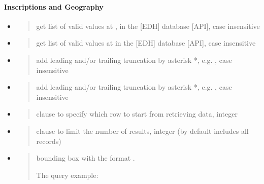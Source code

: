 \documentclass[a4paper,12pt,english]{sphinxhowto}
\begin{document}
\paragraph{Inscriptions and Geography}
\label{\detokenize{Epigraphic:inscriptions-and-geography}}\begin{itemize}
\item {} 
\begin{quote}

get list of valid values at ,
in the {[}EDH{]} database {[}API{]}, case insensitive
\end{quote}

\item {} 
\begin{quote}

get list of valid values at 
in the {[}EDH{]} database {[}API{]}, case insensitive
\end{quote}

\item {} 
\begin{quote}

add leading and/or trailing truncation by asterisk *, e.g.
, case insensitive
\end{quote}

\item {} 
\begin{quote}

add leading and/or trailing truncation by asterisk *, e.g.
, case insensitive
\end{quote}

\item {} 
\begin{quote}

clause to specify which row to start from retrieving data, integer
\end{quote}

\item {} 
\begin{quote}

clause to limit the number of results, integer (by default includes all records)
\end{quote}

\item {} 
\begin{quote}

bounding box with the format .

The query example:
\end{quote}

\end{itemize}
\end{document}
